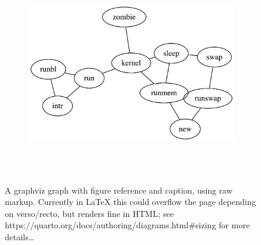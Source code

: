 \documentclass[
  12pt,
  a4paper,
  oneside,
  numbers=noenddot,
  titlepage,
  toclink=all,
  toc=bibliography]{scrbook}
\theoremstyle{definition}
\theoremstyle{definition}
\theoremstyle{definition}
\theoremstyle{plain}
\theoremstyle{plain}
\theoremstyle{plain}
\theoremstyle{plain}
\theoremstyle{plain}
\theoremstyle{remark}
\begin{document}
\begin{figure}

{\centering 

\begin{figure}[H]

{\centering \includegraphics[width=5.5in,height=3.5in]{index_files/figure-latex/dot-figure-3.png}

}

\end{figure}

}

\caption{\label{fig-scriv14B}A graphviz graph with figure reference and
caption, using raw markup. Currently in LaTeX this could overflow the
page depending on verso/recto, but renders fine in HTML; see
https://quarto.org/docs/authoring/diagrams.html\#sizing for more
details\ldots{}}

\end{figure}
\end{document}
